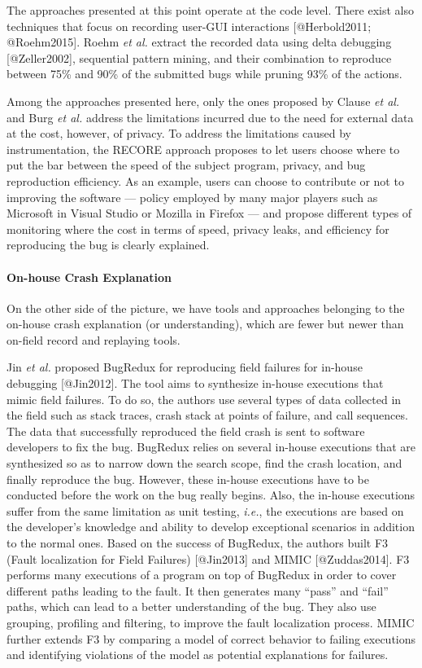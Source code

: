 The approaches presented at this point operate at the code level. There
exist also techniques that focus on recording user-GUI interactions
{[}@Herbold2011; @Roehm2015{]}. Roehm {\emph{et al.}} extract the
recorded data using delta debugging {[}@Zeller2002{]}, sequential
pattern mining, and their combination to reproduce between 75\% and 90\%
of the submitted bugs while pruning 93\% of the actions.

Among the approaches presented here, only the ones proposed by Clause
{\emph{et al.}} and Burg {\emph{et al.}} address the limitations
incurred due to the need for external data at the cost, however, of
privacy. To address the limitations caused by instrumentation, the
RECORE approach proposes to let users choose where to put the bar
between the speed of the subject program, privacy, and bug reproduction
efficiency. As an example, users can choose to contribute or not to
improving the software --- policy employed by many major players such as
Microsoft in Visual Studio or Mozilla in Firefox --- and propose
different types of monitoring where the cost in terms of speed, privacy
leaks, and efficiency for reproducing the bug is clearly explained.

\paragraph{On-house Crash Explanation}\label{on-house-crash-explanation}

On the other side of the picture, we have tools and approaches belonging
to the on-house crash explanation (or understanding), which are fewer
but newer than on-field record and replaying tools.

Jin {\emph{et al.}} proposed BugRedux for reproducing field failures for
in-house debugging {[}@Jin2012{]}. The tool aims to synthesize in-house
executions that mimic field failures. To do so, the authors use several
types of data collected in the field such as stack traces, crash stack
at points of failure, and call sequences. The data that successfully
reproduced the field crash is sent to software developers to fix the
bug. BugRedux relies on several in-house executions that are synthesized
so as to narrow down the search scope, find the crash location, and
finally reproduce the bug. However, these in-house executions have to be
conducted before the work on the bug really begins. Also, the in-house
executions suffer from the same limitation as unit testing,
{\emph{i.e.}}, the executions are based on the developer's knowledge and
ability to develop exceptional scenarios in addition to the normal ones.
Based on the success of BugRedux, the authors built F3 (Fault
localization for Field Failures) {[}@Jin2013{]} and MIMIC
{[}@Zuddas2014{]}. F3 performs many executions of a program on top of
BugRedux in order to cover different paths leading to the fault. It then
generates many ``pass'' and ``fail'' paths, which can lead to a better
understanding of the bug. They also use grouping, profiling and
filtering, to improve the fault localization process. MIMIC further
extends F3 by comparing a model of correct behavior to failing
executions and identifying violations of the model as potential
explanations for failures.

